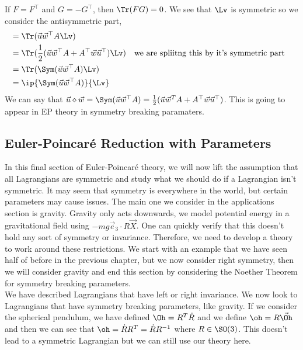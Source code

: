 
\noindent
If $F = F^\top$ and $G = -G^\top$, then $\Tr(FG) = 0$. We see that $\Lv$ is symmetric so we consider the antisymmetric part,
\begin{align*}
  &= \Tr(\vec u\vec w^\top A \Lv )\\
  &= \Tr (\frac{1}{2}(\vec u\vec w^\top A + A^\top \vec w\vec u^\top)\Lv ) && \text{we are spliitng this by it's symmetric part} \\
  &= \Tr(\Sym(\vec u\vec w^\top A)\Lv) \\
  &= \ip{\Sym(\vec u\vec w^\top A)}{\Lv}
\end{align*}
We can say that $\vec u \diamond \vec w = \Sym(\vec u\vec w^\top A) = \frac{1}{2}(\vec u\vec w^T A + A^\top \vec w\vec u^\top)$. This is going to appear in EP theory in symmetry breaking paramaters.

\subsection{Euler-Poincar\'e Reduction with Parameters}
In this final section of Euler-Poincar\'e theory, we will now lift the assumption that all Lagrangians are symmetric and study what we should do if a Lagrangian isn't symmetric. It may seem that symmetry is everywhere in the world, but certain parameters may cause issues. The main one we consider in the applications section is gravity. Gravity only acts downwards, we model potential energy in a gravitational field using $-mg\vec e_3 \cdot R\vec X$. One can quickly verify that this doesn't hold any sort of symmetry or invariance. Therefore, we need to develop a theory to work around these restrictions. We start with an example that we have seen half of before in the previous chapter, but we now consider right symmetry, then we will consider gravity and end this section by considering the Noether Theorem for symmetry breaking parameters.\\

\noindent
We have described Lagrangians that have left or right invariance. We now look to Lagrangians that have symmetry breaking parameters, like gravity. If we consider the spherical pendulum, we have defined $\Oh = R^T\dot R$ and we define $\oh = R\vec\Oh$ and then we can see that $\oh = \dot R R^T = \dot R R^{-1}$ where $R \in \SO(3)$. This doesn't lead to a symmetric Lagrangian but we can still use our theory here. \\

